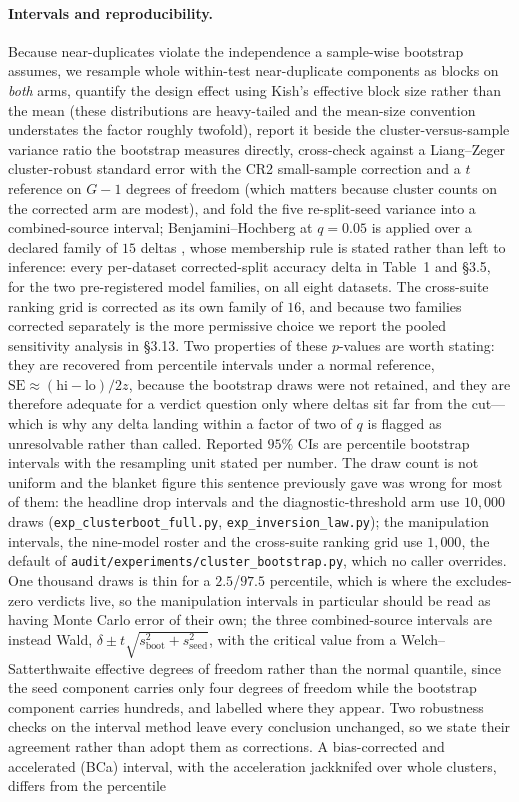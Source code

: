 \documentclass[11pt,a4paper]{article}
\begin{document}
\paragraph{Intervals and reproducibility.} Because near-duplicates violate the independence a sample-wise bootstrap assumes, we resample whole within-test near-duplicate components as blocks on \emph{both} arms, quantify the design effect using Kish's effective block size rather than the mean (these distributions are heavy-tailed and the mean-size convention understates the factor roughly twofold), report it beside the cluster-versus-sample variance ratio the bootstrap measures directly, cross-check against a Liang--Zeger cluster-robust standard error with the CR2 small-sample correction and a $t$ reference on $G-1$ degrees of freedom (which matters because cluster counts on the corrected arm are modest), and fold the five re-split-seed variance into a combined-source interval; Benjamini--Hochberg at $q=0.05$ is applied over a declared family of $15$ deltas \citep{benjamini1995fdr}, whose membership rule is stated rather than left to inference: every per-dataset corrected-split accuracy delta in Table~1 and \S3.5, for the two pre-registered model families, on all eight datasets. The cross-suite ranking grid is corrected as its own family of $16$, and because two families corrected separately is the more permissive choice we report the pooled sensitivity analysis in \S3.13. Two properties of these $p$-values are worth stating: they are recovered from percentile intervals under a normal reference, $\mathrm{SE}\approx(\text{hi}-\text{lo})/2z$, because the bootstrap draws were not retained, and they are therefore adequate for a verdict question only where deltas sit far from the cut---which is why any delta landing within a factor of two of $q$ is flagged as unresolvable rather than called. Reported $95\%$ CIs are percentile bootstrap intervals with the resampling unit stated per number. The draw count is not uniform and the blanket figure this sentence previously gave was wrong for most of them: the headline drop intervals and the diagnostic-threshold arm use $10{,}000$ draws (\texttt{exp\_clusterboot\_full.py}, \texttt{exp\_inversion\_law.py}); the manipulation intervals, the nine-model roster and the cross-suite ranking grid use $1{,}000$, the default of \texttt{audit/experiments/cluster\_bootstrap.py}, which no caller overrides. One thousand draws is thin for a $2.5$/$97.5$ percentile, which is where the excludes-zero verdicts live, so the manipulation intervals in particular should be read as having Monte Carlo error of their own; the three combined-source intervals are instead Wald, $\delta\pm t\sqrt{s^{2}_{\mathrm{boot}}+s^{2}_{\mathrm{seed}}}$, with the critical value from a Welch--Satterthwaite effective degrees of freedom rather than the normal quantile, since the seed component carries only four degrees of freedom while the bootstrap component carries hundreds, and labelled where they appear. Two robustness checks on the interval method leave every conclusion unchanged, so we state their agreement rather than adopt them as corrections. A bias-corrected and accelerated (BCa) interval, with the acceleration jackknifed over whole clusters, differs from the percentile 
\end{document}
